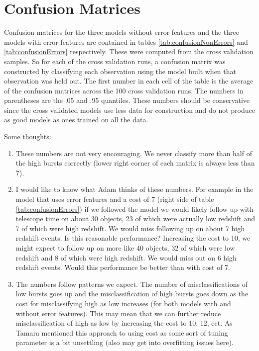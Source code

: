 \documentclass[10pt]{article}
\begin{document}


\section{Confusion Matrices}
Confusion matrices for the three models without error features and the three models with error features are contained in tables \ref{tab:confusionNonErrors} and \ref{tab:confusionErrors} respectively. These were computed from the cross validation samples. So for each of the cross validation runs, a confusion matrix was constructed by classifying each observation using the model built when that observation was held out. The first number in each cell of the table is the average of the confusion matrices across the 100 cross validation runs. The numbers in parentheses are the .05 and .95 quantiles. These numbers should be conservative since the cross validated models use less data for construction and do not produce as good models as ones trained on all the data. 

Some thoughts:
\begin{enumerate}
\item These numbers are not very encouraging. We never classify more than half of the high bursts correctly (lower right corner of each matrix is always less than 7).
\item I would like to know what Adam thinks of these numbers. For example in the model that uses error features and a cost of 7 (right side of table \ref{tab:confusionErrors}) if we followed the model we would likely follow up with telescope time on about 30 objects, 23 of which were actually low redshift and 7 of which were high redshift. We would miss following up on about 7 high redshift events. Is this reasonable performance? Increasing the cost to 10, we might expect to follow up on more like 40 objects, 32 of which were low redshift and 8 of which were high redshift. We would miss out on 6 high redshift events. Would this performance be better than with cost of 7.
\item The numbers follow patterns we expect. The number of misclassifications of low bursts goes up and the misclassification of high bursts goes down as the cost for misclassifying high as low increases (for both models with and without error features). This may mean that we can further reduce misclassification of high as low by increasing the cost to 10, 12, ect. As Tamara mentioned this approach to using cost as some sort of tuning parameter is a bit unsettling (also may get into overfitting issues here). 
\end{enumerate}
\end{document}
